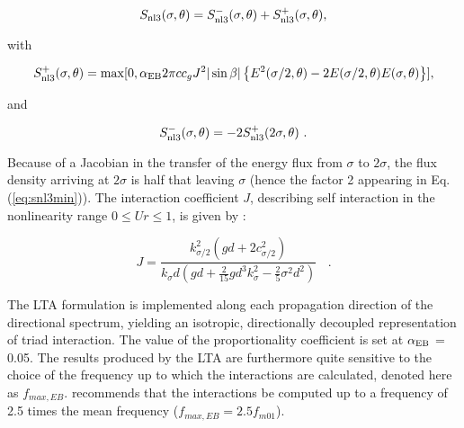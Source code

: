 \begin{equation}
   S_{\rm nl3} (\sigma,\theta) = S^-_{\rm nl3} (\sigma,\theta) + S^+_{\rm nl3}
   (\sigma,\theta)  ,
   \label{eq:snl3}
\end{equation}

\noindent
with

\begin{equation}
  S^+_{\rm nl3} (\sigma,\theta) = \max [0,\alpha_{\rm EB} 2 \pi c c_g J^2 |\sin\beta| \left \{ E^2(\sigma/2,\theta) - 
  2 E(\sigma/2,\theta) E(\sigma,\theta) \right \}]  ,
  \label{eq:snl3plu}
\end{equation}

\noindent
and

\begin{equation}
  S^-_{\rm nl3} (\sigma,\theta) = -2 S^+_{\rm nl3} (2\sigma,\theta)\  .
  \label{eq:snl3min}
\end{equation}

\noindent
Because of a Jacobian in the transfer of the energy flux from $\sigma$ to $2
\sigma$, the flux density arriving at $2 \sigma$ is half that leaving $\sigma$
(hence the factor 2 appearing in Eq. (\ref{eq:snl3min})). The interaction
coefficient $J$, describing self interaction in the nonlinearity range $0 \leq
Ur \leq 1$, is given by \citep{art:MS93}:

\begin{equation}
   J = \frac{k^2_{\sigma/2} (gd + 2 c^2_{\sigma/2})}
      {k_\sigma d (gd + \frac{2}{15} gd^3 k^2_\sigma - \frac{2}{5} \sigma^2
        d^2)}\ \:\:\:  .
   \label{eq:intcoef}
\end{equation}

\noindent
The LTA formulation is implemented along each propagation direction of 
the directional spectrum, yielding an isotropic, directionally decoupled 
representation of triad interaction. The value of the proportionality 
coefficient is set at $\alpha_{\rm EB}$ = 0.05. The results produced by 
the LTA are furthermore quite sensitive to the choice of the frequency up 
to which the interactions are calculated, denoted here as $f_{max,EB}$. 
\citep{rep:Eld95} recommends that the interactions be computed 
up to a frequency of 2.5 times the mean frequency ($f_{max,EB} = 
2.5 f_{m01}$).
